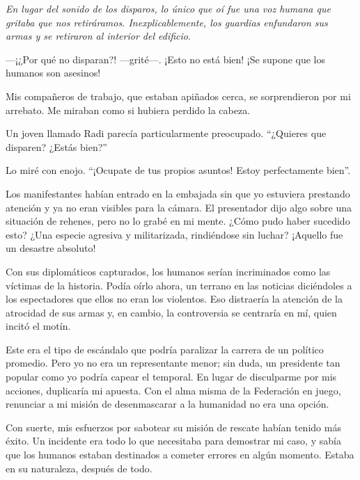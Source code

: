 \textit{En lugar del sonido de los disparos, lo único que oí fue una voz humana que gritaba que nos retiráramos. Inexplicablemente, los guardias enfundaron sus armas y se retiraron al interior del edificio}.

—¡¿Por qué no disparan?! —grité—. ¡Esto no está bien! ¡Se supone que los humanos son asesinos!

Mis compañeros de trabajo, que estaban apiñados cerca, se sorprendieron por mi arrebato. Me miraban como si hubiera perdido la cabeza.

Un joven llamado Radi parecía particularmente preocupado. ``¿Quieres que disparen? ¿Estás bien?''

Lo miré con enojo. ``¡Ocupate de tus propios asuntos! Estoy perfectamente bien''.

Los manifestantes habían entrado en la embajada sin que yo estuviera prestando atención y ya no eran visibles para la cámara. El presentador dijo algo sobre una situación de rehenes, pero no lo grabé en mi mente. ¿Cómo pudo haber sucedido esto? ¿Una especie agresiva y militarizada, rindiéndose sin luchar? ¡Aquello fue un desastre absoluto!

Con sus diplomáticos capturados, los humanos serían incriminados como las víctimas de la historia. Podía oírlo ahora, un terrano en las noticias diciéndoles a los espectadores que ellos no eran los violentos. Eso distraería la atención de la atrocidad de sus armas y, en cambio, la controversia se centraría en mí, quien incitó el motín.

Este era el tipo de escándalo que podría paralizar la carrera de un político promedio. Pero yo no era un representante menor; sin duda, un presidente tan popular como yo podría capear el temporal. En lugar de disculparme por mis acciones, duplicaría mi apuesta. Con el alma misma de la Federación en juego, renunciar a mi misión de desenmascarar a la humanidad no era una opción.

Con suerte, mis esfuerzos por sabotear su misión de rescate habían tenido más éxito. Un incidente era todo lo que necesitaba para demostrar mi caso, y sabía que los humanos estaban destinados a cometer errores en algún momento. Estaba en su naturaleza, después de todo.